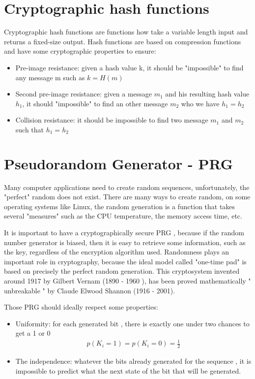 \documentclass[10pt,a4paper]{report}
\begin{document}
\section{Cryptographic hash functions}

Cryptographic hash functions are functions how take a variable length input and returns a fixed-size output. 
Hash functions are based on compression functions and have some cryptographic properties to ensure: 

\begin{itemize}
\item Pre-image resistance: given a hash value k, it should be "impossible" to find any message m such as $k=H(m)$
\item Second pre-image resistance: given a message $m_{1}$ and his resulting hash value $h_{1}$, it should  "impossible" to find an other message $m_{2}$ who we have $h_{1}=h_{2}$
\item Collision resistance: it should be impossible to find two message $m_{1}$ and $m_{2}$ such that   $h_{1} = h_{2}$
\end{itemize}

\section{Pseudorandom Generator - PRG}
Many computer applications need to create random sequences, unfortunately, the "perfect" random does not exist. 
There are many ways to create random, on some operating systems like Linux, the random generation is a function that takes several "measures" such as the CPU temperature, the memory access time, etc.\newline

It is important to have a cryptographically secure PRG , because if the random number generator is biased, then it is easy to retrieve some information, such as the key, regardless of the encryption algorithm used. Randomness plays an important role in cryptography, because the ideal model called "one-time pad" is based on precisely the perfect random generation. \newline
This cryptosystem invented around 1917 by Gilbert Vernam (1890 - 1960 ), has been proved mathematically " unbreakable " by Claude Elwood Shannon (1916 - 2001).\newline


Those PRG should ideally respect some properties:\newline
\begin{itemize}
\item Uniformity: for each generated bit , there is exactly one under two chances to get a 1 or 0 
\begin{align*}
p ( K_i = 1) = p ( K_i = 0) = \frac {1}{2}
\end{align*}
\item The independence: whatever the bits already generated for the sequence , it is impossible to predict what the next state of the bit that will be generated. 
\end{itemize}
\end{document}
